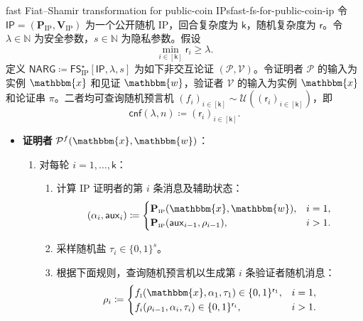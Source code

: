 \documentclass[american,singlepageview]{snargs-book-zh}
\newcommand{\Bits}{\{0,1\}}
\newcommand{\DefineEqual}{\coloneqq}
\newcommand{\AuxiliaryState}{\mathsf{aux}}
\newcommand{\Naturals}{\mathbb{N}}
\newcommand{\Instance}{\mathbbm{x}}
\newcommand{\Witness}{\mathbbm{w}}
\newcommand{\InstanceSize}{n}
\newcommand{\ProtoProver}{P}
\newcommand{\ProtoVerifier}{V}
\newcommand{\ProtoSalt}{\tau}
\newcommand{\ProtoRoundComplexity}{\mathsf{k}}
\newcommand{\ProtoRandomnessComplexity}{\mathsf{r}}
\newcommand{\RoundIndex}{i}
\newcommand{\IPSymbol}{\mathsf{IP}}
\newcommand{\IPSystem}{(\IPProver,\IPVerifier)}
\newcommand{\IPSubscript}{\scriptscriptstyle\mathrm{IP}}
\newcommand{\IPFormat}[1]{\mathbf{#1}}
\newcommand{\IPProver}{\IPFormat{\ProtoProver}_{\IPSubscript}}
\newcommand{\IPVerifier}{\IPFormat{\ProtoVerifier}_{\IPSubscript}}
\newcommand{\IPRoundComplexity}{\ProtoRoundComplexity}
\newcommand{\IPRandomnessComplexity}{\ProtoRandomnessComplexity}
\newcommand{\IPProverMessage}{\alpha}
\newcommand{\IPVerifierRandomMessage}{\rho}
\newcommand{\IPTuple}[1]{(#1_{\RoundIndex})_{\RoundIndex \in [\IPRoundComplexity]}}
\newcommand{\IPAuxiliaryState}{\AuxiliaryState}
\newcommand{\NARGSymbol}{\mathsf{NARG}}
\newcommand{\ARGFormat}[1]{\mathcal{#1}}
\newcommand{\ARGOracles}{\mathsf{cnf}}
\newcommand{\ARGProver}{\ARGFormat{\ProtoProver}}
\newcommand{\ARGVerifier}{\ARGFormat{\ProtoVerifier}}
\newcommand{\ARGSystem}{(\ARGProver,\ARGVerifier)}
\newcommand{\ARGString}{\pi}
\newcommand{\ROFunction}{f}
\newcommand{\RODistribution}[1]{\mathcal{U}(#1)}
\newcommand{\SecurityParameter}{\lambda}
\newcommand{\PrivacyParameter}{s}
\newcommand{\ROFSFirstRoundSymbol}{\scriptscriptstyle \mathsf{1}}
\newcommand{\ROFSFirstRoundFunction}{\ROFunction_{\ROFSFirstRoundSymbol}}
\newcommand{\RandSaltString}{\ProtoSalt}
\newcommand{\RandSaltSize}{s}
\newcommand{\FormatTransName}[1]{\bm{\mathsf{#1}}}
\newcommand{\FastFSonIPSymbol}{\FormatTransName{FS}_{\IPSubscript}^{\star}}
\newcommand{\FormatTransInputs}[3]{[#1,#2,#3]}
\newcommand{\FastFSonIPTransformation}[3]{\FastFSonIPSymbol\FormatTransInputs{#1}{#2}{#3}}
\newcommand{\FastFSonIPText}{fast Fiat--Shamir transformation for public-coin IPs\xspace}
\newcommand{\FSFirstQuery}{(\Instance,\IPProverMessage_{1},\RandSaltString_{1})}
\newcommand{\FastFSLaterQuery}[1]{(\IPVerifierRandomMessage_{#1-1},\IPProverMessage_{#1},\RandSaltString_{#1})}
\begin{document}
\begin{ImportantConstruction}{\FastFSonIPText}{fast-fs-for-public-coin-ip}
令 $\IPSymbol=\IPSystem$ 为一个公开随机 IP，回合复杂度为 $\IPRoundComplexity$，随机复杂度为 $\IPRandomnessComplexity$。令 $\SecurityParameter\in\Naturals$ 为安全参数，$\RandSaltSize\in\Naturals$ 为隐私参数。假设
\[
\min_{\RoundIndex\in[\IPRoundComplexity]}\IPRandomnessComplexity_{\RoundIndex}\ge\SecurityParameter.
\]
定义 $\NARGSymbol\DefineEqual\FastFSonIPTransformation{\IPSymbol}{\SecurityParameter}{\PrivacyParameter}$ 为如下非交互论证 $\ARGSystem$。令证明者 $\ARGProver$ 的输入为实例 $\Instance$ 和见证 $\Witness$，验证者 $\ARGVerifier$ 的输入为实例 $\Instance$ 和论证串 $\ARGString$。二者均可查询随机预言机 $\IPTuple{\ROFunction}\sim\RODistribution{\IPTuple{\IPRandomnessComplexity}}$，即
\[
\ARGOracles(\SecurityParameter,\InstanceSize)\DefineEqual\IPTuple{\IPRandomnessComplexity}.
\]
\begin{itemize}
  \item \textbf{证明者} $\ARGProver^{\ROFunction}(\Instance,\Witness)$：
  \begin{enumerate}[nolistsep]
    \item 对每轮 $\RoundIndex=1,\dots,\IPRoundComplexity$：
    \begin{enumerate}[nolistsep]
      \item 计算 IP 证明者的第 $\RoundIndex$ 条消息及辅助状态：
      \[
      (\IPProverMessage_{\RoundIndex},\IPAuxiliaryState_{\RoundIndex})
      \DefineEqual
      \begin{cases}
      \IPProver(\Instance,\Witness), & \RoundIndex=1,\\
      \IPProver(\IPAuxiliaryState_{\RoundIndex-1},\IPVerifierRandomMessage_{\RoundIndex-1}), & \RoundIndex>1.
      \end{cases}
      \]
      \item 采样随机盐 $\RandSaltString_{\RoundIndex}\in\Bits^{\RandSaltSize}$。
      \item 根据下面规则，查询随机预言机以生成第 $\RoundIndex$ 条验证者随机消息：
      \[
      \IPVerifierRandomMessage_{\RoundIndex}
      \DefineEqual
      \begin{cases}
      \ROFSFirstRoundFunction\FSFirstQuery\in\Bits^{\IPRandomnessComplexity_1}, & \RoundIndex=1,\\
      \ROFunction_{\RoundIndex}\FastFSLaterQuery{\RoundIndex}\in\Bits^{\IPRandomnessComplexity_{\RoundIndex}}, & \RoundIndex>1.
      \end{cases}
      \]
    \end{enumerate}

\end{enumerate}
\end{itemize}
\end{ImportantConstruction}
\end{document}

